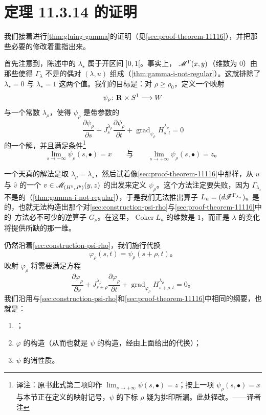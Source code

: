 
\section{定理 11.3.14 的证明}
\label{sec:proof-theorem-11314}

我们接着进行\cref{thm:gluing-gamma}的证明（见\cref{sec:proof-theorem-11116}），并把那些必要的修改着重指出来。

首先注意到，陈述中的 $\lambda_{\star}$ 属于开区间 $]0,1[$。事实上，\trManifold{} $\mathscr{M}^{\Gamma}(x,y)$（维数为 $0$）由那些使得\trHomotopy{} $\Gamma_{\lambda}$ 不是\trRegular{}的偶对 $(\lambda,u)$ 组成（\cref{thm:gamma-i-not-regular}）。这就排除了 $\lambda_{\star}=0$ 与 $\lambda_{\star}=1$ 这两个值。我们的目标是：对 $\rho\ge\rho_{0}$，定义一个映射
\[
\psi_{\rho}\colon\mathbf{R}\times S^{1}\longrightarrow W
\]
与一个常数 $\lambda_{\rho}$，使得 $\psi_{\rho}$ 是带参数的\trFloerEquation
\[
\frac{\partial\psi_{\rho}}{\partial s}+J_{s}^{\lambda_{\rho}}\frac{\partial\psi_{\rho}}{\partial t}+\operatorname{grad}_{\psi_{\rho}}H^{\lambda_{\rho}}_{s,t}=0
\]
的一个解，并且满足条件\footnote{译注：原书此式第二项印作 $\lim_{s\to+\infty}\psi(s,\bullet)=z$；按上一项 $\psi_{\rho}(s,\bullet)=x$ 与本节正在定义的映射记号，$\psi$ 的下标 $\rho$ 疑为排印所漏。此处径改。——译者注}
\[
\lim_{s\to-\infty}\psi_{\rho}(s,\bullet)=x
\qquad\text{与}\qquad
\lim_{s\to+\infty}\psi_{\rho}(s,\bullet)=z\text{。}
\]

\begin{remark}\label{thm:naive-constant-lambda}
一个天真的解法是取 $\lambda_{\rho}=\lambda_{\star}$，然后试着像\cref{sec:proof-theorem-11116}中那样，从 $u$ 与 $\widehat{v}$ 的一个\trLift{} $v\in\mathscr{M}_{(H^{b},J^{b})}(y,z)$ 的\trPregluing{}出发来定义 $\psi_{\rho}$。这个方法注定要失败，因为\trHomotopy{} $\Gamma_{\lambda_{\star}}$ 不是\trRegular{}的（\cref{thm:gamma-i-not-regular}），于是我们无法推出\trLinearization{}算子 $L_{u}=(d\mathscr{F}^{\Gamma_{\lambda_{\star}}})_{u}$ 是\trSurjective{}的，也就无法构造出那个对\cref{sec:construction-psi-rho}与\cref{sec:proof-theorem-11116}中的\trNewton--\trPicard{}方法必不可少的逆算子 $G_{\rho}$。在这里，$\operatorname{Coker}L_{u}$ 的维数是 $1$，而正是 $\lambda$ 的变化将提供所缺的那一维。
\end{remark}

仍然沿着\cref{sec:construction-psi-rho}，我们施行代换
\[
\varphi_{\rho}(s,t)=\psi_{\rho}(s+\rho,t)\text{。}
\]
映射 $\varphi_{\rho}$ 将需要满足方程
\[
\frac{\partial\varphi_{\rho}}{\partial s}+J_{s+\rho}^{\lambda_{\rho}}\frac{\partial\varphi_{\rho}}{\partial t}+\operatorname{grad}_{\varphi_{\rho}}H^{\lambda_{\rho}}_{s+\rho,t}=0\text{。}
\]
我们沿用与\cref{sec:construction-psi-rho}和\cref{sec:proof-theorem-11116}中相同的纲要，也就是：
\begin{enumerate}[label=(\arabic*)]
\item \trPregluing；
\item $\varphi$ 的构造（从而也就是 $\psi$ 的构造，经由上面给出的代换）；
\item $\psi$ 的诸性质。
\end{enumerate}

